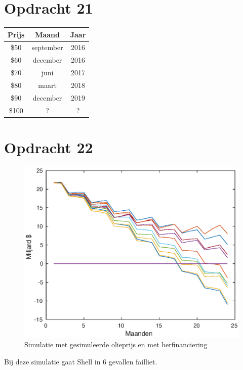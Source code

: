 \documentclass[11pt,a4paper]{article}
\begin{document}


\section*{Opdracht 21}

\begin{table}[H]
\centering
\begin{tabular}{c|c|c}
Prijs & Maand & Jaar\\
\hline
\$50 & september & 2016\\
\$60 & december & 2016\\
\$70 & juni & 2017\\
\$80 & maart & 2018\\
\$90 & december & 2019\\
\$100 & ? & ?\\
\end{tabular}
\end{table}

\section*{Opdracht 22}

\begin{figure}[H]
\centering
\includegraphics[scale=0.75]{opdracht22}
\caption{Simulatie met gesimuleerde olieprijs en met herfinanciering}
\end{figure}
Bij deze simulatie gaat Shell in 6 gevallen failliet.
\end{document}
